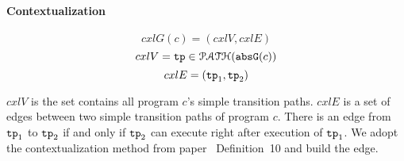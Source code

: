 
\paragraph{Contextualization}

\[
  cxlG(c) = (cxlV, cxlE)
  \]
  \[cxlV = \mathtt{tp} \in \mathcal{PATH}(\mathtt{abs}{\mathtt{G}}(c))
  \]
  \[
    cxlE = (\mathtt{tp}_1, \mathtt{tp}_2)\]

    $cxlV$ is the set contains all program $c$'s simple transition paths.
$cxlE$ is a set of edges between two simple transition paths of program $c$. There is an edge from $\mathtt{tp}_1$ to $\mathtt{tp}_2$
if and only if $\mathtt{tp}_2$ can execute right after execution of $\mathtt{tp}_1$.
We adopt the contextualization method from paper~\cite{ZulegerGSV11} Definition~10 and build the edge.
